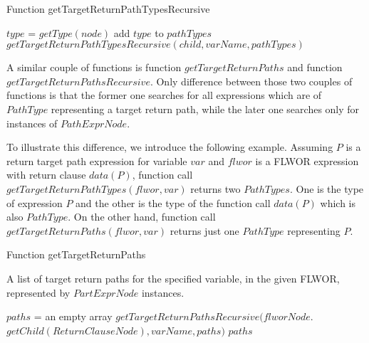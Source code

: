 \begin{algorithm}
\caption{Function getTargetReturnPathTypesRecursive}
\label{ALG_function_get_target_return_path_types_recursive}
\begin{algorithmic}[1]

	\STATE $type$ = $getType(node)$
		\STATE add $type$ to $pathTypes$
	\ENDIF
\ENDIF
{}
	\STATE $getTargetReturnPathTypesRecursive(child, varName, pathTypes)$
\ENDFOR
\end{algorithmic}
\end{algorithm}

A similar couple of functions is function $getTargetReturnPaths$ and function $getTargetReturnPathsRecursive$. Only difference between those two couples of functions is that the former one searches for all expressions which are of $PathType$ representing a target return path, while the later one searches only for instances of $PathExprNode$.

To illustrate this difference, we introduce the following example. Assuming $P$ is a return target path expression for variable $var$ and $flwor$ is a FLWOR expression with return clause $data(P)$, function call $getTargetReturnPathTypes(flwor, var)$ returns two $PathTypes$. One is the type of expression $P$ and the other is the type of the function call $data(P)$ which is also $PathType$. On the other hand, function call $getTargetReturnPaths(flwor, var)$ returns just one $PathType$ representing $P$. 

\begin{algorithm}
\caption{Function getTargetReturnPaths}
\label{ALG_function_get_target_return_paths}
\begin{algorithmic}[1]
\ENSURE A list of target return paths for the specified variable, in the given FLWOR, represented by $PartExprNode$ instances.

\STATE $paths$ = an empty array
\STATE $getTargetReturnPathsRecursive(flworNode.$ $getChild(ReturnClauseNode), varName, paths)$
\RETURN $paths$
\end{algorithmic}
\end{algorithm}

